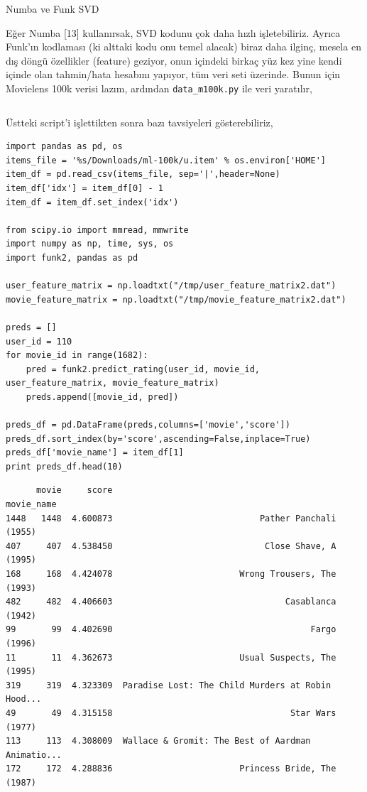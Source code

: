 \documentclass[12pt,fleqn]{article}\usepackage{../../common}
\begin{document}
Numba ve Funk SVD

Eğer Numba [13] kullanırsak, SVD kodunu çok daha hızlı işletebiliriz. Ayrıca
Funk'ın kodlaması (ki alttaki kodu onu temel alacak) biraz daha ilginç, mesela
en dış döngü özellikler (feature) geziyor, onun içindeki birkaç yüz kez yine
kendi içinde olan tahmin/hata hesabını yapıyor, tüm veri seti üzerinde. Bunun
için Movielens 100k verisi lazım, ardından \verb!data_m100k.py! ile veri
yaratılır,

\inputminted[fontsize=\footnotesize]{python}{funk2.py}

Üstteki script'i işlettikten sonra bazı tavsiyeleri gösterebiliriz,

\begin{verbatim}
import pandas as pd, os
items_file = '%s/Downloads/ml-100k/u.item' % os.environ['HOME']
item_df = pd.read_csv(items_file, sep='|',header=None)
item_df['idx'] = item_df[0] - 1
item_df = item_df.set_index('idx')

from scipy.io import mmread, mmwrite
import numpy as np, time, sys, os
import funk2, pandas as pd

user_feature_matrix = np.loadtxt("/tmp/user_feature_matrix2.dat")
movie_feature_matrix = np.loadtxt("/tmp/movie_feature_matrix2.dat")

preds = []
user_id = 110
for movie_id in range(1682):
    pred = funk2.predict_rating(user_id, movie_id, user_feature_matrix, movie_feature_matrix)
    preds.append([movie_id, pred])

preds_df = pd.DataFrame(preds,columns=['movie','score'])
preds_df.sort_index(by='score',ascending=False,inplace=True)
preds_df['movie_name'] = item_df[1]
print preds_df.head(10)
\end{verbatim}

\begin{verbatim}
      movie     score                                         movie_name
1448   1448  4.600873                             Pather Panchali (1955)
407     407  4.538450                              Close Shave, A (1995)
168     168  4.424078                         Wrong Trousers, The (1993)
482     482  4.406603                                  Casablanca (1942)
99       99  4.402690                                       Fargo (1996)
11       11  4.362673                         Usual Suspects, The (1995)
319     319  4.323309  Paradise Lost: The Child Murders at Robin Hood...
49       49  4.315158                                   Star Wars (1977)
113     113  4.308009  Wallace & Gromit: The Best of Aardman Animatio...
172     172  4.288836                         Princess Bride, The (1987)
\end{verbatim}
\end{document}
